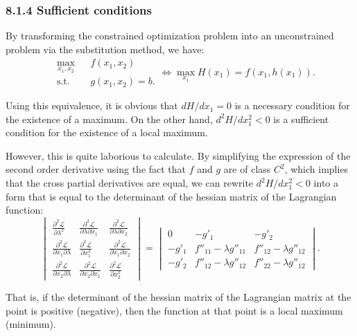 \documentclass[0pt, a4paper]{article}
\newcommand{\Lagr}{\mathcal{L}}
\begin{document}
\subsubsection*{8.1.4 Sufficient conditions}

By transforming the constrained optimization problem into an unconstrained problem via the substitution method, we have:
\begin{equation*}
	\begin{aligned}
		& \underset{x_1,x_2}{\text{max}}
		& & f(x_1,x_2) \\
		& \text{s.t.}
		& & g(x_1,x_2)=b.
	\end{aligned}
	\Leftrightarrow
	\max_{x_1} H(x_1)=f(x_1,h(x_1)).
\end{equation*}

Using this equivalence, it is obvious that $dH/dx_1=0$ is a necessary condition for the existence of a maximum. On the other hand, $d^2H/dx_1^2<0$ is a sufficient condition for the existence of a local maximum. 

However, this is quite laborious to calculate. By simplifying the expression of the second order derivative using the fact that $f$ and $g$ are of class $C^2$, which implies that the cross partial derivatives are equal, we can rewrite $d^2H/dx_1^2<0$ into a form that is equal to the determinant of the hessian matrix of the Lagrangian function:
$$
\begin{vmatrix}
	\frac{\partial^2 \Lagr}{\partial \lambda^2} & \frac{\partial^2 \Lagr}{\partial\lambda\partial x_1} & \frac{\partial^2 \Lagr}{\partial\lambda\partial x_2}\\ 
	\frac{\partial^2 \Lagr}{\partial x_1\partial\lambda} & \frac{\partial^2 \Lagr}{\partial x_1^2} & \frac{\partial^2 \Lagr}{\partial x_1\partial x_2}\\ 
	\frac{\partial^2 \Lagr}{\partial x_2\partial\lambda} & \frac{\partial^2 \Lagr}{\partial x_2\partial x_1} & \frac{\partial^2 \Lagr}{\partial x_2^2}
\end{vmatrix}
=
\begin{vmatrix}
0 & -g'_1 & -g'_2\\ 
-g'_1 & f''_{11}-\lambda g''_{11} & f''_{12}-\lambda g''_{12}\\ 
-g'_2 & f''_{12}-\lambda g''_{12} & f''_{22}-\lambda g''_{12}
\end{vmatrix}.
$$

That is, if the determinant of the hessian matrix of the Lagrangian matrix at the point is positive (negative), then the function at that point is a local maximum (minimum).
\end{document}
